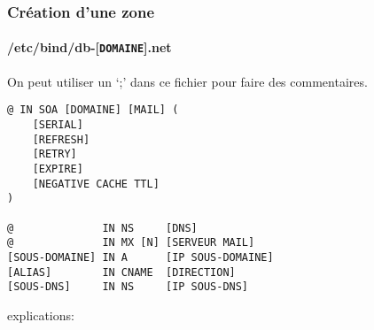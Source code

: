 \documentclass[10pt,a4paper,french]{article}
\begin{document}
\subsubsection{Création d'une zone}

\paragraph{/etc/bind/db-[{\tt DOMAINE}].net}
On peut utiliser un `;' dans ce fichier pour faire des commentaires.
\begin{verbatim}
@ IN SOA [DOMAINE] [MAIL] (
    [SERIAL]
    [REFRESH]
    [RETRY]
    [EXPIRE]
    [NEGATIVE CACHE TTL]
)

@              IN NS     [DNS]
@              IN MX [N] [SERVEUR MAIL]
[SOUS-DOMAINE] IN A      [IP SOUS-DOMAINE]
[ALIAS]        IN CNAME  [DIRECTION]
[SOUS-DNS]     IN NS     [IP SOUS-DNS]
\end{verbatim}
explications:
\end{document}
